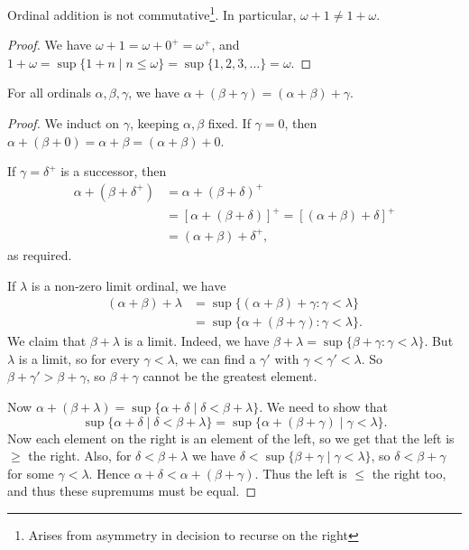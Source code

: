 \documentclass[a4paper, 10pt, twocolumn]{amsart}
\begin{document}
\begin{proposition}
  Ordinal addition is not commutative\footnote{Arises from asymmetry in decision to recurse on the right}. In particular, $\omega + 1 \neq 1 + \omega$.
\end{proposition}
\begin{proof}
  We have $\omega+1 = \omega + 0^+ = \omega^+$, and $1 + \omega = \sup\{1 + n \mid n \leq \omega\} = \sup \{1, 2, 3, \dots\} = \omega$.
\end{proof}

\begin{proposition}
  For all ordinals $\alpha, \beta, \gamma$, we have $\alpha + (\beta + \gamma) = (\alpha + \beta) + \gamma$.
\end{proposition}
\begin{proof}
We induct on $\gamma$, keeping $\alpha, \beta$ fixed. If $\gamma=0$, then $\alpha+(\beta+0)= \alpha+\beta=(\alpha+\beta)+0$.

If $\gamma = \delta^+$ is a successor, then
\begin{align*}
  \alpha + (\beta + \delta^+) &= \alpha + (\beta + \delta)^+ \\
  &= [\alpha + (\beta + \delta)]^+ = [(\alpha + \beta) + \delta]^+ \\
  &= (\alpha + \beta) + \delta^+,
\end{align*}
as required.

If $\lambda$ is a non-zero limit ordinal, we have
\begin{align*}
(\alpha+\beta)+\lambda & =\sup \{(\alpha+\beta)+\gamma: \gamma<\lambda\} \\
& =\sup \{\alpha+(\beta+\gamma): \gamma<\lambda\} .
\end{align*}
We claim that $\beta+\lambda$ is a limit.
Indeed, we have $\beta+\lambda=\sup \{\beta+\gamma: \gamma<\lambda\}$. 
But $\lambda$ is a limit, so for every $\gamma < \lambda$, we can find a $\gamma'$ with $\gamma < \gamma' < \lambda$. So $\beta + \gamma' > \beta + \gamma$, so $\beta + \gamma$ cannot be the greatest element.

Now $\alpha + (\beta + \lambda) = \sup\{\alpha + \delta \mid \delta < \beta + \lambda\}$.
We need to show that 
$$\sup\{\alpha + \delta \mid \delta < \beta +\lambda\} = \sup \{\alpha + (\beta + \gamma) \mid \gamma < \lambda\}.
$$
Now each element on the right is an element of the left, so we get that the left is $\geq$ the right. Also, for $\delta < \beta + \lambda$ we have $\delta < \sup \{\beta + \gamma \mid \gamma < \lambda\}$, so $\delta < \beta + \gamma$ for some $\gamma < \lambda$. Hence $\alpha + \delta < \alpha + (\beta + \gamma)$. Thus the left is $\leq$ the right too, and thus these supremums must be equal.
\end{proof}
\end{document}
